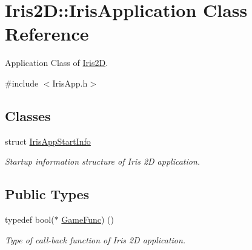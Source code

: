 \hypertarget{class_iris2_d_1_1_iris_application}{}\section{Iris2D\+:\+:Iris\+Application Class Reference}
\label{class_iris2_d_1_1_iris_application}


Application Class of \hyperlink{namespace_iris2_d}{Iris2D}.  




{\ttfamily \#include $<$Iris\+App.\+h$>$}

\subsection*{Classes}
\begin{DoxyCompactItemize}
\item 
struct \hyperlink{struct_iris2_d_1_1_iris_application_1_1_iris_app_start_info}{Iris\+App\+Start\+Info}
\begin{DoxyCompactList}\small\item\em Startup information structure of Iris 2D application. \end{DoxyCompactList}\end{DoxyCompactItemize}
\subsection*{Public Types}
\begin{DoxyCompactItemize}
\item 
\mbox{\label{class_iris2_d_1_1_iris_application_ac74720e6cd3a1968f73e92ea99675884}} 
typedef bool($\ast$ \hyperlink{class_iris2_d_1_1_iris_application_ac74720e6cd3a1968f73e92ea99675884}{Game\+Func}) ()
\begin{DoxyCompactList}\small\item\em Type of call-\/back function of Iris 2D application. \end{DoxyCompactList}\end{DoxyCompactItemize}
